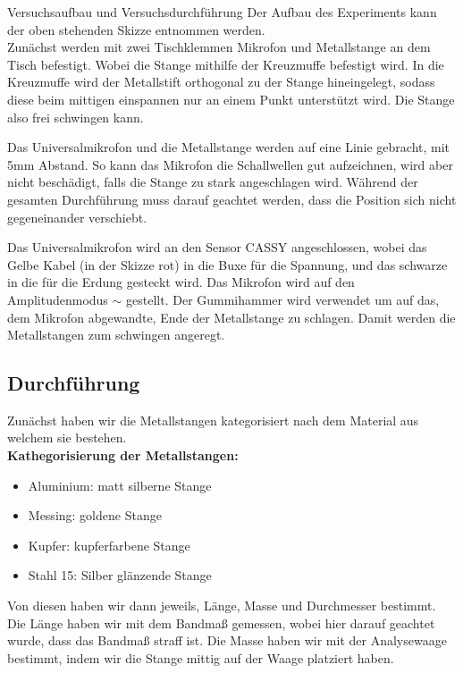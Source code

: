 \documentclass[twoside]{protokoll}
\begin{document}
\begin{aufgabe}{Versuchsaufbau und Versuchsdurchführung}
Der Aufbau des Experiments kann der oben stehenden Skizze entnommen werden. \\


Zunächst werden mit zwei Tischklemmen Mikrofon und Metallstange an dem Tisch befestigt. Wobei die Stange mithilfe der Kreuzmuffe befestigt wird. In die Kreuzmuffe wird der Metallstift orthogonal zu der Stange hineingelegt, sodass diese beim mittigen einspannen nur an einem Punkt unterstützt wird. Die Stange also frei schwingen kann. 

Das Universalmikrofon und die Metallstange werden auf eine Linie gebracht, mit 5mm Abstand.
So kann das Mikrofon die Schallwellen gut aufzeichnen, wird aber nicht beschädigt, falls die Stange zu stark angeschlagen wird.
Während der gesamten Durchführung muss darauf geachtet werden, dass die Position sich nicht gegeneinander verschiebt. 


Das Universalmikrofon wird an den Sensor CASSY angeschlossen, wobei das Gelbe Kabel (in der Skizze rot) in die Buxe für die Spannung, und das schwarze in die für die Erdung gesteckt wird.
Das Mikrofon wird auf den Amplitudenmodus $\sim$ gestellt. Der Gummihammer wird verwendet um auf das, dem Mikrofon abgewandte, Ende der Metallstange zu schlagen. Damit werden die Metallstangen zum schwingen angeregt.

\subsection{Durchführung}

Zunächst haben wir die Metallstangen kategorisiert nach dem Material aus welchem sie bestehen.\\

\textbf{Kathegorisierung der Metallstangen:}

\begin{itemize}
\item Aluminium:		 matt silberne Stange 
\item Messing:		 goldene Stange
\item Kupfer:			 kupferfarbene Stange
\item Stahl 15:		 Silber glänzende Stange
\end{itemize}

Von diesen haben wir dann jeweils, Länge, Masse und Durchmesser bestimmt. 
Die Länge haben wir mit dem Bandmaß gemessen, wobei hier darauf geachtet wurde, dass das Bandmaß straff ist.
Die Masse haben wir mit der Analysewaage bestimmt, indem wir die Stange mittig auf der Waage platziert haben. 



\end{aufgabe}
\end{document}
